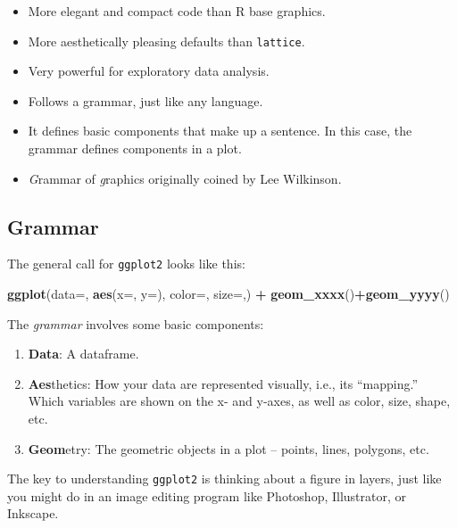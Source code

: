 \documentclass[
]{book}
\newenvironment{Shaded}{\begin{snugshade}}{\end{snugshade}}
\newcommand{\DataTypeTok}[1]{\textcolor[rgb]{0.13,0.29,0.53}{#1}}
\newcommand{\KeywordTok}[1]{\textcolor[rgb]{0.13,0.29,0.53}{\textbf{#1}}}
\newcommand{\NormalTok}[1]{#1}
\newcommand{\OperatorTok}[1]{\textcolor[rgb]{0.81,0.36,0.00}{\textbf{#1}}}
\newcommand{\StringTok}[1]{\textcolor[rgb]{0.31,0.60,0.02}{#1}}
\providecommand{\tightlist}{%
  \setlength{\itemsep}{0pt}\setlength{\parskip}{0pt}}
\begin{document}
\begin{itemize}
\tightlist
\item
  More elegant and compact code than R base graphics.
\item
  More aesthetically pleasing defaults than \texttt{lattice}.
\item
  Very powerful for exploratory data analysis.
\item
  Follows a grammar, just like any language.
\item
  It defines basic components that make up a sentence. In this case, the grammar defines components in a plot.
\item
  \emph{G}rammar of \emph{g}raphics originally coined by Lee Wilkinson.
\end{itemize}

\hypertarget{grammar}{%
\subsection{Grammar}\label{grammar}}

The general call for \texttt{ggplot2} looks like this:

\begin{Shaded}
\begin{Highlighting}[]
\KeywordTok{ggplot}\NormalTok{(}\DataTypeTok{data=}\NormalTok{, }\KeywordTok{aes}\NormalTok{(}\DataTypeTok{x=}\NormalTok{, }\DataTypeTok{y=}\NormalTok{), }\DataTypeTok{color=}\NormalTok{, }\DataTypeTok{size=}\NormalTok{,) }\OperatorTok{+}\StringTok{ }\KeywordTok{geom_xxxx}\NormalTok{()}\OperatorTok{+}\KeywordTok{geom_yyyy}\NormalTok{()}
\end{Highlighting}
\end{Shaded}

The \emph{grammar} involves some basic components:

\begin{enumerate}
\def\labelenumi{\arabic{enumi}.}
\tightlist
\item
  \textbf{Data}: A dataframe.
\item
  \textbf{Aes}thetics: How your data are represented visually, i.e., its ``mapping.'' Which variables are shown on the x- and y-axes, as well as color, size, shape, etc.
\item
  \textbf{Geom}etry: The geometric objects in a plot -- points, lines, polygons, etc.
\end{enumerate}

The key to understanding \texttt{ggplot2} is thinking about a figure in layers, just like you might do in an image editing program like Photoshop, Illustrator, or Inkscape.
\end{document}
